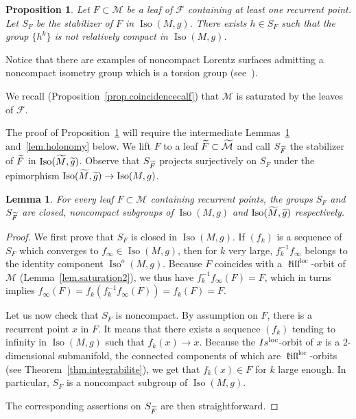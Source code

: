 \documentclass[11pt]{article}
\newtheorem{lemm}[theo]{Lemma}
\newtheorem{prop}[theo]{Proposition}
\theoremstyle{definition}
\numberwithin{equation}{section}
\numberwithin{figure}{section}
\numberwithin{table}{section}
\DeclareMathOperator{\iso}{Iso}
\DeclareMathOperator{\Iso}{Iso}
\DeclareMathOperator{\Is}{Is}
\DeclareMathOperator{\loc}{loc}
\DeclareMathOperator{\kil}{{\mathfrak{kill}}}
\newcommand{\kiloc}{\kil^{\loc}}
\newcommand{\calf}{\mathcal{F}}
\newcommand{\calm}{\mathcal{M}}
\newcommand{\tcalm}{\tilde{\mathcal{M}}}
\newcommand{\tm}{\tilde{{M}}}
\newcommand{\tF}{\tilde{{F}}}
\let\oldtilde\tilde
\renewcommand*\tilde[1]{\mathchoice{\widetilde{#1}}{\widetilde{#1}}{\widetilde{#1}}{\oldtilde{#1}}}
\begin{document}
\begin{prop}\label{prop.pastorsion}
Let $F \subset \calm$ be a leaf of $\calf$ containing at least one recurrent point. Let $S_F$ be the stabilizer of $F$ in $\Iso(M,g)$. There exists $h \in S_{F}$ such that the group $\{ h^k \}$ is not relatively compact in $\Iso(M,g)$.
\end{prop}

Notice that there are examples of noncompact Lorentz surfaces admitting a noncompact isometry group which is a torsion group (see~\cite[Remarque 4.12]{mounoud}).


We recall (Proposition~\ref{prop.coincidencecalf}) that $\calm$ is saturated by the leaves of $\calf$.


The proof of Proposition~\ref{prop.pastorsion} will require the intermediate Lemmas~\ref{lem.stab-ferme} and~\ref{lem.holonomy} below. We lift $F$ to a leaf $\tF \subset \tcalm$ and call ${S}_{\tF}$ the stabilizer of $\tF$ in $\Iso(\tm,\tilde{g})$. Observe that ${S}_{\tF}$ projects surjectively on $S_F$ under the epimorphism $\Iso(\tm, \tilde{g}) \to \Iso(M,g)$.
\begin{lemm}\label{lem.stab-ferme}
For every leaf $F \subset \calm$ containing recurrent points, the groups $S_F$ and $S_{\tF}$ are closed, noncompact subgroups of $\Iso(M,g)$ and $\Iso(\tm,\tilde{g})$ respectively.
\end{lemm}

\begin{proof}
We first prove that $S_F$ is closed in $\Iso(M,g)$.
If $(f_k)$ is a sequence of $S_F$ which converges to $f_{\infty} \in \iso(M,g)$, then for $k$ very large, $f_k^{-1}f_{\infty}$ belongs to the identity component $\Iso^o(M,g)$. Because $F$ coincides with a $\kiloc$-orbit of $\calm$ (Lemma~\ref{lem.saturation2}), we thus have $f_k^{-1}f_{\infty}(F)=F$, which in turns implies $f_{\infty}(F)=f_k(f_k^{-1}f_{\infty}(F))=f_k(F)=F$.

Let us now check that $S_F$ is noncompact. By assumption on $F$, there is a recurrent point $x$ in $F$. It means that there exists a sequence $(f_k)$ tending to infinity in $\Iso(M,g)$ such that $f_k(x) \to x$. Because the $\\Is^{\loc}$-orbit of $x$ is a $2$-dimensional submanifold, the connected components of which are $\kiloc$-orbits (see Theorem~\ref{thm.integrabilite}), we get that $f_k(x) \in F$ for $k$ large enough. In particular, $S_F$ is a noncompact subgroup of $\Iso(M,g)$.

The corresponding assertions on $S_{\tF}$ are then straightforward.
\end{proof}
\end{document}
